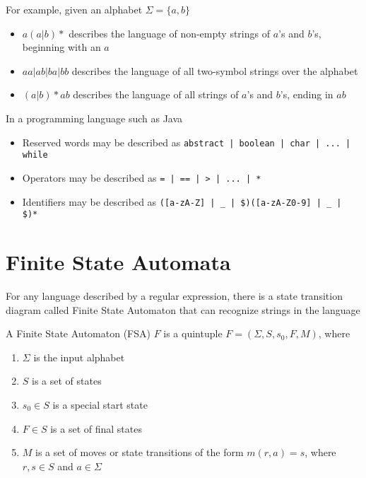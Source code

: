 \documentclass[8pt,a4paper,compress]{beamer}
\begin{document}
\begin{frame}[fragile]
\pause

For example, given an alphabet $\Sigma = \{a,b\}$

\begin{itemize}
\pause
\item $a(a|b)*$ describes the language of \pause non-empty strings of $a$'s and $b$'s, beginning with an $a$

\pause
\item $aa | ab | ba | bb$ describes the language of \pause all two-symbol strings over the alphabet

\pause
\item $(a|b)\!*\!ab$ describes the language of \pause all strings of $a$'s and $b$'s, ending in $ab$
\end{itemize}

\pause\bigskip

In a programming language such as Java
\begin{itemize}
\pause
\item Reserved words may be described as \lstinline{abstract | boolean | char | ... | while}

\pause
\item Operators may be described as \lstinline{= | == | > | ... | *}

\pause
\item Identifiers may be described as \lstinline{([a-zA-Z] | _ | $)([a-zA-Z0-9] | _ | $)*}
\end{itemize}
\end{frame}

\section{Finite State Automata}
\begin{frame}[fragile]
\pause

For any language described by a regular expression, there is a state transition diagram called Finite State Automaton that can recognize strings in the language

\pause\bigskip

A Finite State Automaton (FSA) $F$ is a quintuple $F = (\Sigma, S, s_0, F, M)$, where
\begin{enumerate}
\pause
\item $\Sigma$ is the input alphabet

\pause
\item $S$ is a set of states

\pause
\item $s_0 \in S$ is a special start state

\pause
\item $F \in S$ is a set of final states

\pause
\item $M$ is a set of moves or state transitions of the form $m(r, a) = s$, where $r,s \in S$ and $a \in \Sigma$
\end{enumerate}
\end{frame}
\end{document}
